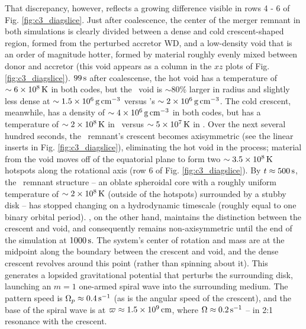 

That discrepancy, however, reflects a growing difference visible in rows 4 - 6 of Fig. \ref{fig:c3_diagslice}.  Just after coalescence, the center of the merger remnant in both simulations is clearly divided between a dense and cold crescent-shaped region, formed from the perturbed accretor WD, and a low-density void that is an order of magnitude hotter, formed by material roughly evenly mixed between donor and accretor (this void appears as a column in the $xz$ plots of Fig. \ref{fig:c3_diagslice}).  $99\,\mathrm{s}$ after coalescense, the hot void has a temperature of $\sim6\times10^8\,\mathrm{K}$ in both codes, but the \arepo\ void is $\sim80$\% larger in radius and slightly less dense at $\sim1.5\times10^6\,\gcc$ versus \gasoline's $\sim2\times10^6\,\gcc$.  The cold crescent, meanwhile, has a density of $\sim4\times10^6\,\gcc$ in both codes, but has a temperature of $\sim2\times10^8\,\mathrm{K}$ in \gasoline\ versus $\sim5\times10^7\,\mathrm{K}$ in \arepo.  Over the next several hundred seconds, the \gasoline\ remnant's crescent becomes axisymmetric (see the linear inserts in Fig. \ref{fig:c3_diagslice}), eliminating the hot void in the process; material from the void moves off of the equatorial plane to form two $\sim3.5\times10^8\,\mathrm{K}$ hotspots along the rotational axis (row 6 of Fig. \ref{fig:c3_diagslice}).  By $t\approx500\,\mathrm{s}$, the \gasoline\ remnant structure -- an oblate spheroidal core with a roughly uniform temperature of $\sim 2 \times 10^8\,\mathrm{K}$ (outside of the hotspots) surrounded by a stubby disk -- has stopped changing on a hydrodynamic timescale (roughly equal to one binary orbital period).  \arepo, on the other hand, maintains the distinction between the crescent and void, and consequently remains non-axisymmetric until the end of the simulation at $1000\,\mathrm{s}$.  The system's center of rotation and mass are at the midpoint along the boundary between the crescent and void, and the dense crescent revolves around this point (rather than spinning about it).  This generates a lopsided gravitational potential that perturbs the surrounding disk, launching an $m = 1$ one-armed spiral wave into the surrounding medium.  The pattern speed is $\Omega_p \approx 0.4\,\mathrm{s}^{-1}$ (as is the angular speed of the crescent), and the base of the spiral wave is at $\varpi \approx 1.5\times10^9\,\mathrm{cm}$, where $\Omega \approx 0.2\,\mathrm{s}^{-1}$ -- in 2:1 resonance with the crescent.

